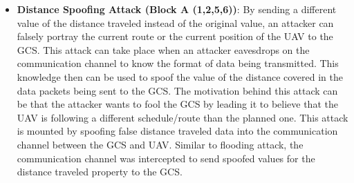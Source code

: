 \begin{itemize}
\item {\bf Distance Spoofing Attack (Block A (1,2,5,6))}: By sending a different value of the distance traveled instead of the original value, an attacker can falsely portray the current route or the current position of the UAV to the GCS. This attack can take place when an attacker eavesdrops on the communication channel to know the format of data being transmitted. This knowledge then can be used to spoof the value of the distance covered in the data packets being sent to the GCS. The motivation behind this attack can be that the attacker wants to fool the GCS by leading it to believe that the UAV is following a different schedule/route than the planned one. This attack is mounted by spoofing false distance traveled data into the communication channel between the GCS and UAV. Similar to flooding attack, the communication channel was intercepted to send spoofed values for the distance traveled property to the GCS.
\end{itemize}


